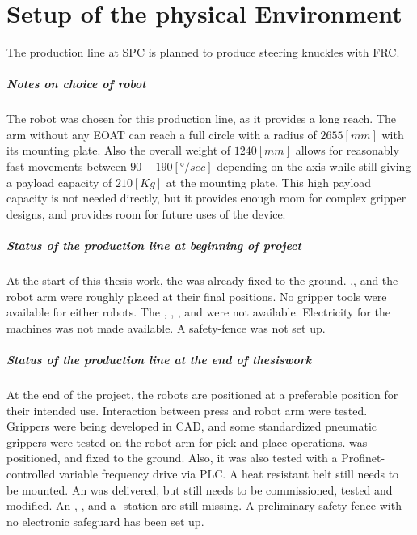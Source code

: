 \chapter{Setup of the physical Environment}
The production line at \ac{SPC} is planned to produce steering knuckles with \ac{FRC}.



\paragraph{Notes on choice of robot} %
The robot was chosen for this production line, as it provides a long reach. The arm without any \ac{EOAT} can reach a full circle with a radius of $2655 [\textit{mm}]$ with its mounting plate. Also the overall weight of $1240 [\textit{mm}]$ allows for reasonably fast movements between $90-190 [\textit{°/sec}] $ depending on the axis while still giving a payload capacity of $210 [\textit{Kg}]$ at the mounting plate.\cite{210FDatasheet}
This high payload capacity is not needed directly, but it provides enough room for complex gripper designs, and provides room for future uses of the device.

\paragraph{Status of the production line at beginning of project}
At the start of this thesis work, the  was already fixed to the ground. 
,, and the robot arm were roughly placed at their final positions.
No gripper tools were available for either robots.
The , , ,  and  were not available.
Electricity for the machines was not made available.
A safety-fence was not set up.

\paragraph{Status of the production line at the end of thesiswork}
At the end of the project, the robots are positioned at a preferable position for their intended use. Interaction between press and robot arm were tested. Grippers were being developed in \ac{CAD}, and some standardized pneumatic grippers were tested on the robot arm for pick and place operations.  was positioned, and fixed to the ground. Also, it was also tested with a Profinet-controlled variable frequency drive via \ac{PLC}. A heat resistant belt still needs to be mounted. An  was delivered, but still needs to be commissioned, tested and modified. 
An , ,  and a -station are still missing.
A preliminary safety fence with no electronic safeguard has been set up. 


